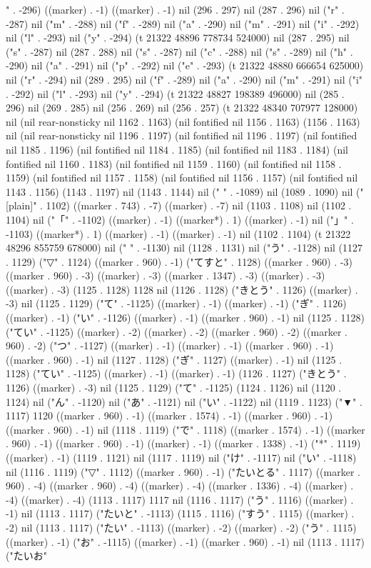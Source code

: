 " . -296) ((marker) . -1) ((marker) . -1) nil (296 . 297) nil (287 . 296) nil ("r" . -287) nil ("m" . -288) nil ("f" . -289) nil ("a" . -290) nil ("m" . -291) nil ("i" . -292) nil ("l" . -293) nil ("y" . -294) (t 21322 48896 778734 524000) nil (287 . 295) nil ("s" . -287) nil (287 . 288) nil ("s" . -287) nil ("c" . -288) nil ("s" . -289) nil ("h" . -290) nil ("a" . -291) nil ("p" . -292) nil ("e" . -293) (t 21322 48880 666654 625000) nil ("r" . -294) nil (289 . 295) nil ("f" . -289) nil ("a" . -290) nil ("m" . -291) nil ("i" . -292) nil ("l" . -293) nil ("y" . -294) (t 21322 48827 198389 496000) nil (285 . 296) nil (269 . 285) nil (256 . 269) nil (256 . 257) (t 21322 48340 707977 128000) nil (nil rear-nonsticky nil 1162 . 1163) (nil fontified nil 1156 . 1163) (1156 . 1163) nil (nil rear-nonsticky nil 1196 . 1197) (nil fontified nil 1196 . 1197) (nil fontified nil 1185 . 1196) (nil fontified nil 1184 . 1185) (nil fontified nil 1183 . 1184) (nil fontified nil 1160 . 1183) (nil fontified nil 1159 . 1160) (nil fontified nil 1158 . 1159) (nil fontified nil 1157 . 1158) (nil fontified nil 1156 . 1157) (nil fontified nil 1143 . 1156) (1143 . 1197) nil (1143 . 1144) nil (" " . -1089) nil (1089 . 1090) nil ("[plain]" . 1102) ((marker . 743) . -7) ((marker) . -7) nil (1103 . 1108) nil (1102 . 1104) nil ("「" . -1102) ((marker) . -1) ((marker*) . 1) ((marker) . -1) nil ("」" . -1103) ((marker*) . 1) ((marker) . -1) ((marker) . -1) nil (1102 . 1104) (t 21322 48296 855759 678000) nil (" " . -1130) nil (1128 . 1131) nil ("う" . -1128) nil (1127 . 1129) ("▽" . 1124) ((marker . 960) . -1) ("てすと" . 1128) ((marker . 960) . -3) ((marker . 960) . -3) ((marker) . -3) ((marker . 1347) . -3) ((marker) . -3) ((marker) . -3) (1125 . 1128) 1128 nil (1126 . 1128) ("きとう" . 1126) ((marker) . -3) nil (1125 . 1129) ("て" . -1125) ((marker) . -1) ((marker) . -1) ("ぎ" . 1126) ((marker) . -1) ("い" . -1126) ((marker) . -1) ((marker . 960) . -1) nil (1125 . 1128) ("てい" . -1125) ((marker) . -2) ((marker) . -2) ((marker . 960) . -2) ((marker . 960) . -2) ("つ" . -1127) ((marker) . -1) ((marker) . -1) ((marker . 960) . -1) ((marker . 960) . -1) nil (1127 . 1128) ("ぎ" . 1127) ((marker) . -1) nil (1125 . 1128) ("てい" . -1125) ((marker) . -1) ((marker) . -1) (1126 . 1127) ("きとう" . 1126) ((marker) . -3) nil (1125 . 1129) ("て" . -1125) (1124 . 1126) nil (1120 . 1124) nil ("ん" . -1120) nil ("あ" . -1121) nil ("い" . -1122) nil (1119 . 1123) ("▼" . 1117) 1120 ((marker . 960) . -1) ((marker . 1574) . -1) ((marker . 960) . -1) ((marker . 960) . -1) nil (1118 . 1119) ("で" . 1118) ((marker . 1574) . -1) ((marker . 960) . -1) ((marker . 960) . -1) ((marker) . -1) ((marker . 1338) . -1) ("*" . 1119) ((marker) . -1) (1119 . 1121) nil (1117 . 1119) nil ("け" . -1117) nil ("い" . -1118) nil (1116 . 1119) ("▽" . 1112) ((marker . 960) . -1) ("たいとる" . 1117) ((marker . 960) . -4) ((marker . 960) . -4) ((marker) . -4) ((marker . 1336) . -4) ((marker) . -4) ((marker) . -4) (1113 . 1117) 1117 nil (1116 . 1117) ("う" . 1116) ((marker) . -1) nil (1113 . 1117) ("たいと" . -1113) (1115 . 1116) ("すう" . 1115) ((marker) . -2) nil (1113 . 1117) ("たい" . -1113) ((marker) . -2) ((marker) . -2) ("う" . 1115) ((marker) . -1) ("お" . -1115) ((marker) . -1) ((marker . 960) . -1) nil (1113 . 1117) ("たいお" 